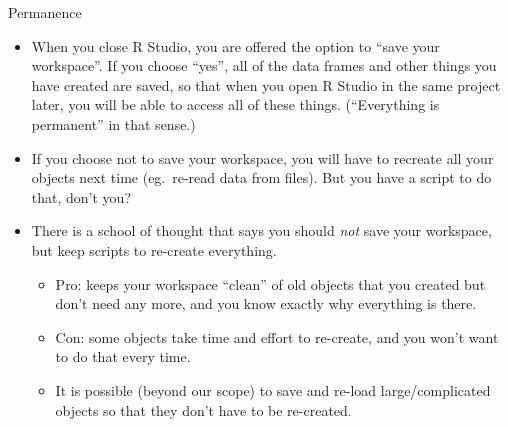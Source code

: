\documentclass[unknownkeysallowed]{beamer}\usepackage[]{graphicx}\usepackage[]{color}
\begin{document}
\begin{frame}[fragile]{Permanence}
  
  \begin{itemize}
  \item When you close R Studio, you are offered the option to ``save
    your workspace''. If you choose ``yes'', all of the data frames
    and other things you have created are saved, so that when you open
    R Studio in the same project later, you will be able to access all
    of these things. (``Everything is permanent'' in that sense.)
  \item If you choose not to save your workspace, you will have to
    recreate all your objects next time (eg.\ re-read data from
    files). But you have a script to do that, don't you?
  \item There is a school of thought that says you should \emph{not}
    save your workspace, but keep scripts to re-create everything.
    \begin{itemize}
    \item Pro: keeps your workspace ``clean'' of old objects that you
      created but don't need any more, and you know exactly why
      everything is there.
    \item Con: some objects take time and effort to re-create, and you
      won't want to do that every time.
    \item It is possible (beyond our scope) to save and re-load
      large/complicated objects so that they don't have to be
      re-created.
    \end{itemize}
  \end{itemize}
  
\end{frame}
\end{document}
